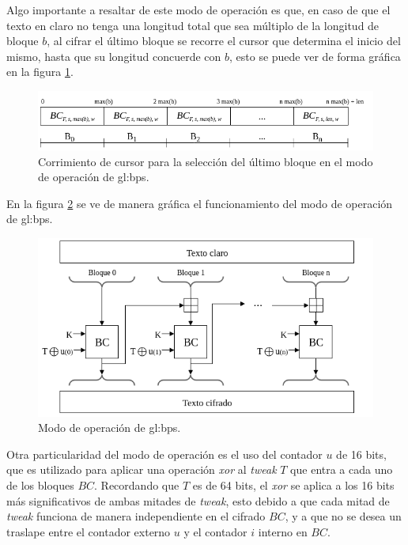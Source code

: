 Algo importante a resaltar de este modo de operación es que, en caso de que el
texto en claro no tenga una longitud total que sea múltiplo de la longitud de
bloque $b$, al cifrar el último bloque se recorre el cursor que determina
el inicio del mismo, hasta que su longitud concuerde con $b$, esto se puede
ver de forma gráfica en la figura \ref{cursor_BPS}.

\begin{figure}
  \begin{center}
    \includegraphics[width=0.8\linewidth]
    {../../../../diagramas_comunes/bps/cursor_bps}
    \caption{Corrimiento de cursor para la selección del último
      bloque en el modo de operación de \gls{gl:bps}.}
    \label{cursor_BPS}
   \end{center}
\end{figure}

En la figura \ref{modo_de_operacion_BPS} se ve de manera gráfica el
funcionamiento del modo de operación de \gls{gl:bps}.

\begin{figure}
  \begin{center}
    \includegraphics[width=0.85\linewidth]
    {../../../../diagramas_comunes/bps/modo_de_operacion_bps}
    \caption{Modo de operación de \gls{gl:bps}.}
    \label{modo_de_operacion_BPS}
   \end{center}
\end{figure}

Otra particularidad del modo de operación es el uso del contador $u$ de 16
bits, que es utilizado para aplicar una operación \textit{xor} al
\textit{tweak} $T$ que entra a cada uno de los bloques $BC$. Recordando que $T$
es de 64 bits, el \textit{xor} se aplica a los 16 bits más significativos de
ambas mitades de \textit{tweak}, esto debido a que cada mitad de \textit{tweak}
funciona de manera independiente en el cifrado $BC$, y a que no se desea un
traslape entre el contador externo $u$ y el contador $i$ interno en $BC$.

